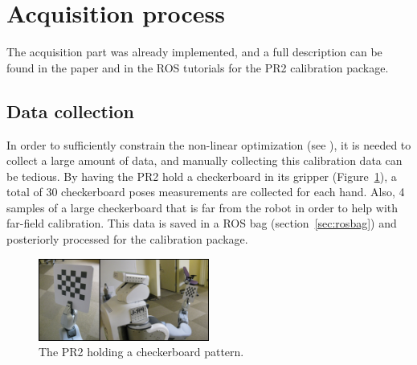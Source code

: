 \section{Acquisition process}
\label{sec:acquisition}

The acquisition part was already implemented, and a full description can be found in the paper  \cite{pr2_calibration_paper} and in the ROS tutorials for the PR2 calibration package.

%


\subsection{Data collection}

In order to sufficiently constrain the non-linear optimization (see \cite{pr2_calibration_paper}), it is needed to collect a large amount of data, and manually collecting this calibration data can be tedious. By having the PR2 hold a checkerboard in its gripper (Figure~\ref{fig:pr2_holdind_cb}), a total of 30 checkerboard poses measurements are collected for each hand. Also, 4 samples of a large checkerboard that is far from the robot in order to help with far-field calibration. This data is saved in a ROS bag (section~\ref{sec:rosbag}) and posteriorly processed for the calibration package.

\begin{figure}[!htbp]
 \centering
 \includegraphics[width=0.5\textwidth]{images/pr2_holdind_cb.png}
 \caption{The PR2 holding a checkerboard pattern.}
 \label{fig:pr2_holdind_cb}
\end{figure}


